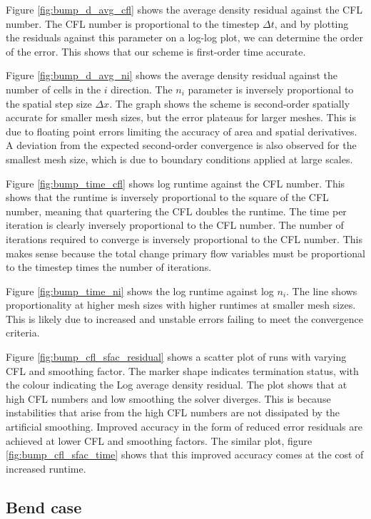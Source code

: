 \documentclass{article}
\begin{document}
Figure \ref{fig:bump_d_avg_cfl} shows the average density residual against the CFL number.
The CFL number is proportional to the timestep $\Delta t$, and by plotting the residuals against this parameter on a log-log plot, we can determine the order of the error.
This shows that our scheme is first-order time accurate.

Figure \ref{fig:bump_d_avg_ni} shows the average density residual against the number of cells in the $i$ direction.
The $n_i$ parameter is inversely proportional to the spatial step size $\Delta x$.
The graph shows the scheme is second-order spatially accurate for smaller mesh sizes, but the error plateaus for larger meshes.
This is due to floating point errors limiting the accuracy of area and spatial derivatives.
A deviation from the expected second-order convergence is also observed for the smallest mesh size,
which is due to boundary conditions applied at large scales. 

Figure \ref{fig:bump_time_cfl} shows log runtime against the CFL number.
This shows that the runtime is inversely proportional to the square of the CFL number, meaning that quartering the CFL doubles the runtime.
The time per iteration is clearly inversely proportional to the CFL number.
The number of iterations required to converge is inversely proportional to the CFL number.
This makes sense because the total change primary flow variables must be proportional to the timestep times the number of iterations.

Figure \ref{fig:bump_time_ni} shows the log runtime against log $n_i$.
The line shows proportionality at higher mesh sizes with higher runtimes at smaller mesh sizes.
This is likely due to increased and unstable errors failing to meet the convergence criteria.

Figure \ref{fig:bump_cfl_sfac_residual} shows a scatter plot of runs with varying CFL and smoothing factor.
The marker shape indicates termination status, with the colour indicating the Log average density residual.
The plot shows that at high CFL numbers and low smoothing the solver diverges.
This is because instabilities that arise from the high CFL numbers are not dissipated by the artificial smoothing.
Improved accuracy in the form of reduced error residuals are achieved at lower CFL and smoothing factors.
The similar plot, figure \ref{fig:bump_cfl_sfac_time} shows that this improved accuracy comes at the cost of increased runtime.

\subsection{Bend case}
\end{document}
